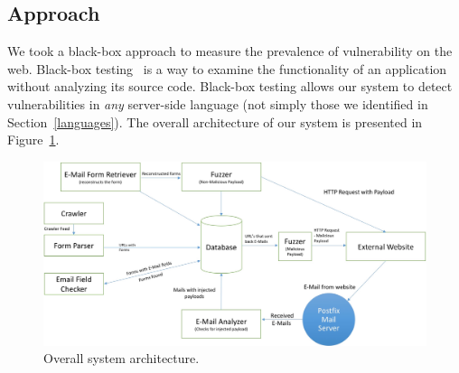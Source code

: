 \subsection{Approach}
\vspace{-2ex}
\label{sys:appr}
We took a black-box approach to measure the prevalence of \ehi
vulnerability on the web. Black-box
testing~\cite{Beizer:1995:BTT:202699} is a way to examine the
functionality of an application without analyzing its source code. Black-box testing allows our system to detect \ehi vulnerabilities in \emph{any} server-side language (not simply those we identified in Section~\ref{languages}). The overall architecture of our system is presented in Figure~\ref{fig:overall}. 

\begin{figure}
	\centering
	\includegraphics[width=.55\textwidth]{overall_crop}
	\caption{Overall system architecture.}
    \vspace{-5ex}
	\label{fig:overall}
\end{figure}
